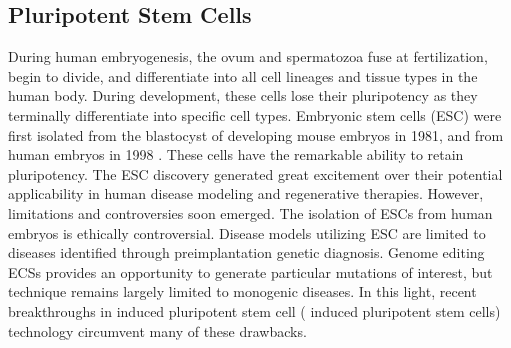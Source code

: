 \documentclass[sigconf]{acmart}
\begin{document}
\subsection{Pluripotent Stem Cells}
During human embryogenesis, the ovum and spermatozoa fuse at fertilization, begin to
divide, and differentiate into all cell lineages and tissue types in the human body. During
development, these cells lose their pluripotency as they terminally differentiate into specific cell
types. Embryonic stem cells (ESC) were first isolated from the blastocyst of developing mouse
embryos in 1981, and from human embryos in 1998 \cite{rippon2004embryonic}. These cells have the remarkable ability to retain pluripotency. The ESC discovery generated great excitement over their potential
applicability in human disease modeling and regenerative therapies. However, limitations and
controversies soon emerged.
The isolation of ESCs from human embryos is ethically controversial. Disease models
utilizing ESC are limited to diseases identified through preimplantation genetic diagnosis.
Genome editing ECSs provides an opportunity to generate particular mutations of interest, but
technique remains largely limited to monogenic diseases. In this light, recent breakthroughs in
induced pluripotent stem cell ( induced pluripotent stem cells) technology circumvent many of these drawbacks.
\end{document}
